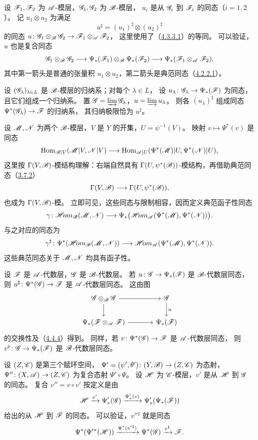 设 $\mathscr F_1,\mathscr F_2$ 为 $\mathscr A$-模层，$\mathscr G_1,\mathscr G_2$ 为 $\mathscr B$-模层，
$u_i$ 是从 $\mathscr G_i$ 到 $\mathscr F_i$ 的同态（$i=1,2$）。
记 $u_1\otimes u_2$ 为满足
\[
 u^\sharp=(u_1)^\sharp\otimes(u_2)^\sharp
\]
的同态 $u\colon\mathscr G_1\otimes_{\mathscr B}\mathscr G_2\to\mathscr F_1\otimes_{\mathscr A}\mathscr F_2$，
这里使用了（\hyperref[eq:0:4.3.3.1]{4.3.3.1}）的等同。
可以验证，$u$ 也是复合同态
\[
 \mathscr G_1\otimes_{\mathscr B}\mathscr G_2
 \longrightarrow\Psi_*(\mathscr F_1)\otimes_{\mathscr B}\Psi_*(\mathscr F_2)
 \longrightarrow\Psi_*(\mathscr F_1\otimes_{\mathscr A}\mathscr F_2),
\]
其中第一箭头是普通的张量积 $u_1\otimes u_2$，第二箭头是典范同态（\hyperref[eq:0:4.2.2.1]{4.2.2.1}）。

设 $(\mathscr G_\lambda)_{\lambda\in L}$ 是 $\mathscr B$-模层的归纳系；对每个 $\lambda\in L$，
设 $u_\lambda\colon\mathscr G_\lambda\to\Psi_*(\mathscr F)$ 为同态，且它们组成一个归纳系。
置 $\mathscr G=\varinjlim\mathscr G_\lambda$，$u=\varinjlim u_\lambda$。
则各 $(u_\lambda)^\sharp$ 组成同态 $\Psi^*(\mathscr G_\lambda)\to\mathscr F$ 的归纳系，
其归纳极限恰为 $u^\sharp$。

设 $\mathscr M,\mathscr N$ 为两个 $\mathscr B$-模层，$V$ 是 $Y$ 的开集，$U=\psi^{-1}(V)$。
映射 $v\mapsto\Psi^*(v)$ 是同态
\[
 \operatorname{Hom}_{\mathscr B|V}(\mathscr M|V,\mathscr N|V)
 \longrightarrow
 \operatorname{Hom}_{\mathscr A|U}(\Psi^*(\mathscr M)|U,\Psi^*(\mathscr N)|U),
\]
这里按 $\Gamma(V,\mathscr B)$-模结构理解：右端自然具有
$\Gamma(U,\psi^*(\mathscr B))$-模结构，再借助典范同态（\hyperlink{para:0:3.7.2}{3.7.2}）
\[
 \Gamma(V,\mathscr B)\longrightarrow\Gamma(U,\psi^*(\mathscr B)),
\]
也成为 $\Gamma(V,\mathscr B)$-模。
立即可见，这些同态与限制相容，因而定义典范函子性同态
\[
 \gamma\colon\mathscr{H}\!om_{\mathscr B}(\mathscr M,\mathscr N)
 \longrightarrow\Psi_*\bigl(\mathscr{H}\!om_{\mathscr A}(\Psi^*(\mathscr M),\Psi^*(\mathscr N))\bigr).
\]
与之对应的同态为
\[
 \gamma^\sharp\colon\Psi^*(\mathscr{H}\!om_{\mathscr B}(\mathscr M,\mathscr N))
 \longrightarrow\mathscr{H}\!om_{\mathscr A}(\Psi^*(\mathscr M),\Psi^*(\mathscr N)).
\]
这些典范同态关于 $\mathscr M,\mathscr N$ 均具有函子性。

设 $\mathscr F$ 是 $\mathscr A$-代数层，$\mathscr G$ 是 $\mathscr B$-代数层。
若 $u\colon\mathscr G\to\Psi_*(\mathscr F)$ 是 $\mathscr B$-代数层同态，
则 $u^\sharp\colon\Psi^*(\mathscr G)\to\mathscr F$ 是 $\mathscr A$-代数层同态。
这由图
\[
\begin{tikzcd}[column sep=large]
 \G\otimes_{\BB}\G\arrow[r]\arrow[d]&\G\arrow[d,"u"]\\
 \Psi_*(\F\otimes_{\A}\F)\arrow[r]&\Psi_*(\F)
\end{tikzcd}
\]
的交换性及（\hyperlink{para:0:4.4.4}{4.4.4}）得到。
同样，若 $v\colon\Psi^*(\mathscr G)\to\mathscr F$ 是 $\mathscr A$-代数层同态，
则 $v^\flat\colon\mathscr G\to\Psi_*(\mathscr F)$ 是 $\mathscr B$-代数层同态。

设 $(Z,\mathscr C)$ 是第三个赋环空间，
$\Psi'=(\psi',\theta')\colon(Y,\mathscr B)\to(Z,\mathscr C)$ 为态射，
$\Psi''\colon(X,\mathscr A)\to(Z,\mathscr C)$ 为复合态射 $\Psi'\circ\Psi$。
设 $\mathscr H$ 为 $\mathscr C$-模层，$v'$ 是从 $\mathscr H$ 到 $\mathscr G$ 的同态。
复合 $v''=v\circ v'$ 按定义是由
\[
 \mathscr H\xrightarrow{v'}\Psi'_*(\mathscr G)
 \xrightarrow{\Psi'_*(v)}\Psi'_*(\Psi_*(\mathscr F))
\]
给出的从 $\mathscr H$ 到 $\mathscr F$ 的同态。
可以验证，$v''{}^\sharp$ 就是同态
\[
 \Psi^*(\Psi'{}^*(\mathscr H))
 \xrightarrow{\Psi^*(v'{}^\sharp)}\Psi^*(\mathscr G)
 \xrightarrow{v^\sharp}\mathscr F.
\]


